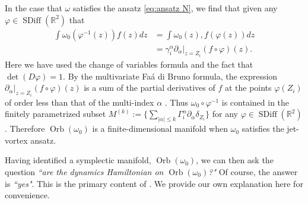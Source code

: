 \documentclass[12pt]{amsart}
\newcommand{\R}{\ensuremath{\mathbb{R}}}
\theoremstyle{remark}
\DeclareMathOperator{\SDiff}{SDiff}
\DeclareMathOperator{\Orb}{Orb}
\begin{document}
In the case that $\omega$ satisfies the ansatz \eqref{eq:ansatz N}, we find that given any $\varphi \in \SDiff(\R^2)$
	that
	\begin{align*}
		\int \omega_0(\varphi^{-1}(z)) f(z) dz &= \int \omega_0(z) , f (\varphi(z)) dz \\
                &= \gamma_i^\alpha \partial_{\alpha}|_{z=Z_i} (f \circ\varphi)(z).
	\end{align*}
	Here we have used the change of variables formula and the fact that $\det( D\varphi) = 1$.
	By the multivariate Fa\'a di Bruno formula, the expression $\partial_{\alpha}|_{z=Z_i} (f \circ\varphi)(z)$
	is a sum of the partial derivatives of $f$ at the points $\varphi(Z_i)$
	of order less than that of the multi-index $\alpha$ \cite{ConstantineSavits1996}.
        Thus $ \omega_0 \circ \varphi^{-1}$ is contained in the finitely parametrized subset $M^{(k)} := \{ \sum_{|\alpha| \leq k} \Gamma_i^\alpha \partial_{\alpha} \delta_{Z_i} \}$
        for any $\varphi \in \SDiff( \R^2)$.
        Therefore $\Orb(\omega_0)$ is a finite-dimensional manifold when $\omega_0$ satisfies the jet-vortex ansatz.

Having identified a symplectic manifold, $\Orb(\omega_0)$, we can then ask the question \emph{``are the dynamics Hamiltonian on $\Orb(\omega_0)$?"}
Of course, the answer is \emph{``yes"}.  This is the primary content of \cite{MarsdenWeinstein1983}.
We provide our own explanation here for convenience.
\end{document}
